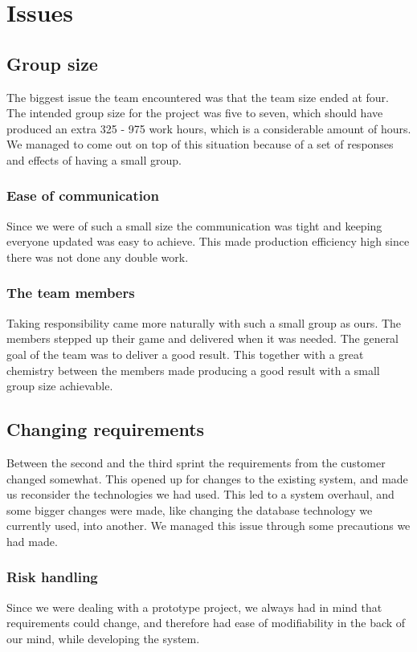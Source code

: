 \section{Issues}

\subsection*{Group size}
The biggest issue the team encountered was that the team size ended at four. The intended group size for the project was five to seven, which should have produced an extra 325 - 975 work hours, which is a considerable amount of hours. We managed to come out on top of this situation because of a set of responses and effects of having a small group.

\subsubsection*{Ease of communication}
Since we were of such a small size the communication was tight and keeping everyone updated was easy to achieve. This made production efficiency high since there was not done any double work. 

\subsubsection*{The team members}
Taking responsibility came more naturally with such a small group as ours. The members stepped up their game and delivered when it was needed. The general goal of the team was to deliver a good result. This together with a great chemistry between the members made producing a good result with a small group size achievable. 


\subsection*{Changing requirements}
Between the second and the third sprint the requirements from the customer changed somewhat. This opened up for changes to the existing system, and made us reconsider the technologies we had used. This led to a system overhaul, and some bigger changes were made, like changing the database technology we currently used, into another. We managed this issue through some precautions we had made.

\subsubsection*{Risk handling}
Since we were dealing with a prototype project, we always had in mind that requirements could change, and therefore had ease of modifiability in the back of our mind, while developing the system.

